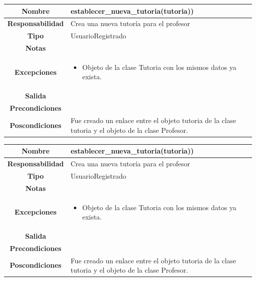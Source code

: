                        \begin{table}[!ht]
\begin{tabular}{|c|m{10cm}|}
\hline\rowcolor{Gray}
{\bf Nombre } & {establecer\_nueva\_tutoria(tutoria))}\\
\hline
{\bf Responsabilidad } & {Crea una nueva tutoría para el profesor}\\
\hline
\rowcolor{Gray}
{\bf Tipo } & {UsuarioRegistrado} \\
\hline
{\bf Notas } & { } \\
\hline
\rowcolor{Gray}
{\bf Excepciones }& {
	   	\begin{itemize}
	  \item Objeto de la clase Tutoria con los mismos datos ya exista.
	    \end{itemize}
} \\
\hline
{\bf Salida }& 
	  {
} 
 \\
\hline
\rowcolor{Gray}
{\bf Precondiciones }& {
}\\
\hline
{\bf Poscondiciones }& { 
Fue creado un enlace entre el objeto tutoria de la clase tutoria y el objeto de la clase Profesor.	  }
  \\
\hline
\end{tabular}

\end{table}



                       \begin{table}[!ht]
\begin{tabular}{|c|m{10cm}|}
\hline\rowcolor{Gray}
{\bf Nombre } & {establecer\_nueva\_tutoria(tutoria))}\\
\hline
{\bf Responsabilidad } & {Crea una nueva tutoría para el profesor}\\
\hline
\rowcolor{Gray}
{\bf Tipo } & {UsuarioRegistrado} \\
\hline
{\bf Notas } & { } \\
\hline
\rowcolor{Gray}
{\bf Excepciones }& {
	   	\begin{itemize}
	  \item Objeto de la clase Tutoria con los mismos datos ya exista.
	    \end{itemize}
} \\
\hline
{\bf Salida }& 
	  {
} 
 \\
\hline
\rowcolor{Gray}
{\bf Precondiciones }& {
}\\
\hline
{\bf Poscondiciones }& { 
Fue creado un enlace entre el objeto tutoria de la clase tutoria y el objeto de la clase Profesor.	  }
  \\
\hline
\end{tabular}

\end{table}

\clearpage